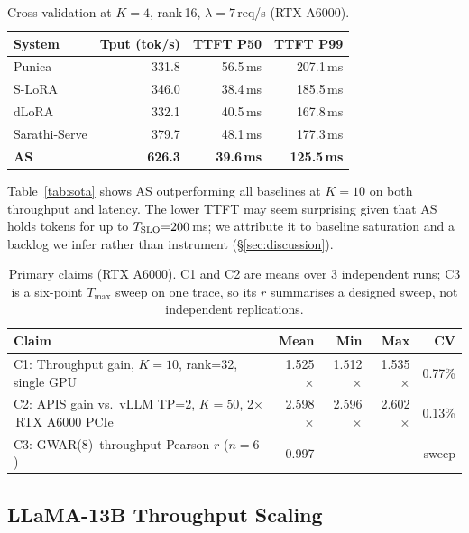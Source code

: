 \documentclass[conference]{IEEEtran}
\newcommand{\asys}{AS\xspace}
\begin{document}
\begin{table}[!t]
\centering\small
\setlength{\tabcolsep}{3.5pt}
\caption{Cross-validation at $K{=}4$, rank\,16, $\lambda{=}7$\,req/s (RTX A6000).}
\label{tab:sotak4}
\begin{tabular}{@{}lrrr@{}}
\toprule
System & Tput (tok/s) & TTFT P50 & TTFT P99 \\
\midrule
Punica         & 331.8 & 56.5\,ms & 207.1\,ms \\
S-LoRA         & 346.0 & 38.4\,ms & 185.5\,ms \\
dLoRA          & 332.1 & 40.5\,ms & 167.8\,ms \\
Sarathi-Serve  & 379.7 & 48.1\,ms & 177.3\,ms \\
\textbf{\asys} & \textbf{626.3} & \textbf{39.6\,ms} & \textbf{125.5\,ms} \\
\bottomrule
\end{tabular}
\end{table}

Table~\ref{tab:sota} shows \asys outperforming all baselines at $K{=}10$ on both
throughput and latency.  The lower TTFT may seem surprising given that \asys
holds tokens for up to
$T_{\rm SLO}{=}200$\,ms; we attribute it to baseline saturation and a backlog we
infer rather than instrument (\S\ref{sec:discussion}).

\begin{table}[!t]
\centering\small
\setlength{\tabcolsep}{6pt}
\caption{Primary claims (RTX A6000).  C1 and C2 are means over 3 independent
  runs; C3 is a six-point $T_{\max}$ sweep on one trace, so its $r$ summarises a
  designed sweep, not independent replications.}
\label{tab:claims}
\begin{tabular}{@{}lrrrr@{}}
\toprule
Claim & Mean & Min & Max & CV \\
\midrule
C1: Throughput gain, $K{=}10$, rank=32, single GPU & 1.525$\times$ & 1.512$\times$ & 1.535$\times$ & 0.77\% \\
C2: APIS gain vs.\ vLLM TP=2, $K{=}50$, 2$\times$\,RTX A6000 PCIe & 2.598$\times$ & 2.596$\times$ & 2.602$\times$ & 0.13\% \\
C3: GWAR(8)--throughput Pearson $r$ ($n{=}6$)        & 0.997         & ---           & ---           & sweep \\
\bottomrule
\end{tabular}
\end{table}

\subsection{LLaMA-13B Throughput Scaling}
\label{sec:llama13b}
\end{document}
